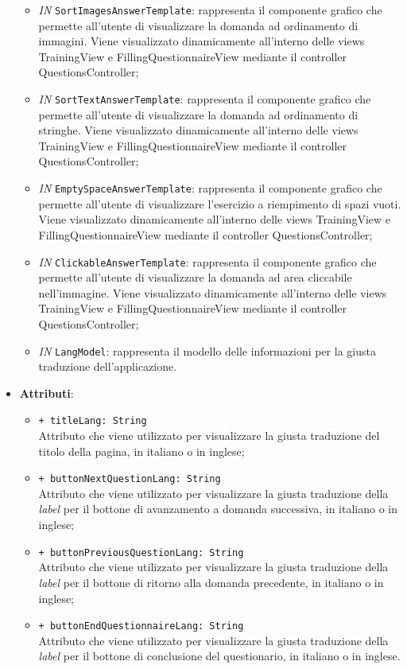 \begin{itemize}
\begin{itemize}
		\item \textit{IN} \texttt{SortImagesAnswerTemplate}: rappresenta il componente grafico che permette all'utente di visualizzare la domanda ad ordinamento di immagini. Viene visualizzato dinamicamente all'interno delle views TrainingView e FillingQuestionnaireView mediante il controller QuestionsController;
		\item \textit{IN} \texttt{SortTextAnswerTemplate}: rappresenta il componente grafico che permette all'utente di visualizzare la domanda ad ordinamento di stringhe. Viene visualizzato dinamicamente all'interno delle views TrainingView e FillingQuestionnaireView mediante il controller QuestionsController;
		\item \textit{IN} \texttt{EmptySpaceAnswerTemplate}: rappresenta il componente grafico che permette all'utente di visualizzare l'esercizio a riempimento di spazi vuoti. Viene visualizzato dinamicamente all'interno delle views TrainingView e FillingQuestionnaireView mediante il controller QuestionsController;
		\item \textit{IN} \texttt{ClickableAnswerTemplate}: rappresenta il componente grafico che permette all'utente di visualizzare la domanda ad area cliccabile nell'immagine. Viene visualizzato dinamicamente all'interno delle views TrainingView e FillingQuestionnaireView mediante il controller QuestionsController;
		\item \textit{IN} \texttt{LangModel}: rappresenta il modello delle informazioni per la giusta traduzione dell'applicazione.
	\end{itemize}
		\item \textbf{Attributi}:
		\begin{itemize}
			\item \texttt{+ titleLang: String} \\ Attributo che viene utilizzato per visualizzare la giusta traduzione del titolo della pagina, in italiano o in inglese;
			\item \texttt{+ buttonNextQuestionLang: String} \\ Attributo che viene utilizzato per visualizzare la giusta traduzione della \textit{label} per il bottone di avanzamento a domanda successiva, in italiano o in inglese;
			\item \texttt{+ buttonPreviousQuestionLang: String} \\ Attributo che viene utilizzato per visualizzare la giusta traduzione della \textit{label} per il bottone di ritorno alla domanda precedente, in italiano o in inglese;
			\item \texttt{+ buttonEndQuestionnaireLang: String} \\ Attributo che viene utilizzato per visualizzare la giusta traduzione della \textit{label} per il bottone di conclusione del questionario, in italiano o in inglese. 
		\end{itemize}
\end{itemize}


